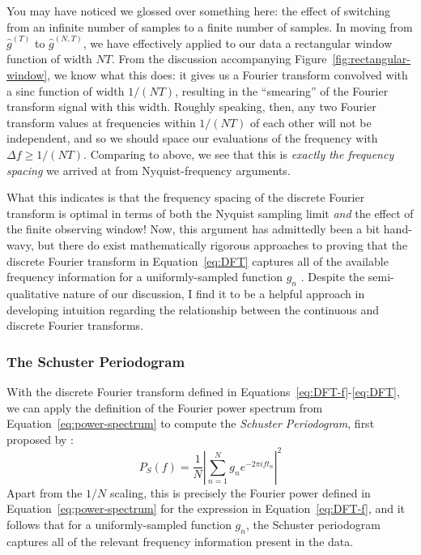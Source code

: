 \documentclass[preprint]{aastex}
\newcommand{\fig}[1]{Figure~\ref{fig:#1}}
\newcommand{\Eq}[1]{Equation~\ref{eq:#1}}
\newcommand{\eq}[1]{\Eq{#1}}
\newcommand{\eqs}[2]{Equations~\ref{eq:#1}-\ref{eq:#2}}
\newcommand{\eqlabel}[1]{\label{eq:#1}}
\begin{document}
You may have noticed we glossed over something here: the effect of switching
from an infinite number of samples to a finite number of samples.
In moving from $\hat{g}^{(T)}$ to $\hat{g}^{(N,T)}$, we have effectively applied
to our data a rectangular window function of width $NT$.
From the discussion accompanying \fig{rectangular-window}, we know what this does:
it gives us a Fourier transform convolved with a sinc function of width
$1 / (NT)$, resulting in the ``smearing'' of the Fourier transform signal
with this width.
Roughly speaking, then, any two Fourier transform values at frequencies within
$1/(NT)$ of each other will not be independent, and so we should space our
evaluations of the frequency with $\Delta f \ge 1/(NT)$.
Comparing to above, we see that this is {\it exactly the frequency spacing}
we arrived at from Nyquist-frequency arguments.

What this indicates is that the frequency spacing of the discrete Fourier
transform is optimal in terms of both the Nyquist sampling limit
{\it and} the effect of the finite observing window!
Now, this argument has admittedly been a bit hand-wavy, but there do exist
mathematically rigorous approaches to proving that the discrete Fourier
transform in \eq{DFT} captures all of the available frequency information
for a uniformly-sampled function $g_n$
\citep[see, e.g.][]{FoundationsOfSignalProcessing}.
Despite the semi-qualitative nature of our discussion,
I find it to be a helpful approach
in developing intuition regarding the relationship between the
continuous and discrete Fourier transforms.

\subsubsection{The Schuster Periodogram}

With the discrete Fourier transform defined in \eqs{DFT-f}{DFT}, we can
apply the definition of the Fourier power spectrum from \eq{power-spectrum}
to compute the {\it Schuster Periodogram}, first proposed by \citet{Schuster98}:
\begin{equation}
  P_S(f) = \frac{1}{N}\left|\sum_{n=1}^N g_n e^{-2\pi i f t_n}\right|^2
  \eqlabel{schuster-periodogram}
\end{equation}
Apart from the $1/N$ scaling, this is precisely the Fourier power defined
in \eq{power-spectrum} for the expression in \eq{DFT-f}, and it follows that
for a uniformly-sampled function $g_n$, the Schuster periodogram captures
all of the relevant frequency information present in the data.
\end{document}
